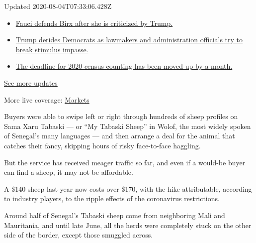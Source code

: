 Updated 2020-08-04T07:33:06.428Z

\begin{itemize}
\tightlist
\item
  \href{https://www.nytimes3xbfgragh.onion/2020/08/03/world/coronavirus-covid-19.html?action=click\&pgtype=Article\&state=default\&region=MAIN_CONTENT_1\&context=storylines_live_updates\#link-4547638f}{Fauci
  defends Birx after she is criticized by Trump.}
\item
  \href{https://www.nytimes3xbfgragh.onion/2020/08/03/world/coronavirus-covid-19.html?action=click\&pgtype=Article\&state=default\&region=MAIN_CONTENT_1\&context=storylines_live_updates\#link-15e7f995}{Trump
  derides Democrats as lawmakers and administration officials try to
  break stimulus impasse.}
\item
  \href{https://www.nytimes3xbfgragh.onion/2020/08/03/world/coronavirus-covid-19.html?action=click\&pgtype=Article\&state=default\&region=MAIN_CONTENT_1\&context=storylines_live_updates\#link-e5a2cda}{The
  deadline for 2020 census counting has been moved up by a month.}
\end{itemize}

\href{https://www.nytimes3xbfgragh.onion/2020/08/03/world/coronavirus-covid-19.html?action=click\&pgtype=Article\&state=default\&region=MAIN_CONTENT_1\&context=storylines_live_updates}{See
more updates}

More live coverage:
\href{https://www.nytimes3xbfgragh.onion/live/2020/08/03/business/stock-market-today-coronavirus?action=click\&pgtype=Article\&state=default\&region=MAIN_CONTENT_1\&context=storylines_live_updates}{Markets}

Buyers were able to swipe left or right through hundreds of sheep
profiles on Sama Xaru Tabaski --- or ``My Tabaski Sheep'' in Wolof, the
most widely spoken of Senegal's many languages --- and then arrange a
deal for the animal that catches their fancy, skipping hours of risky
face-to-face haggling.

But the service has received meager traffic so far, and even if a
would-be buyer can find a sheep, it may not be affordable.

A \$140 sheep last year now costs over \$170, with the hike
attributable, according to industry players, to the ripple effects of
the coronavirus restrictions.

Around half of Senegal's Tabaski sheep come from neighboring Mali and
Mauritania, and until late June, all the herds were completely stuck on
the other side of the border, except those smuggled across.

